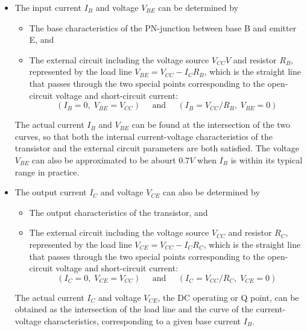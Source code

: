 \begin{itemize}
\item The input current $I_B$ and voltage $V_{BE}$ can be determined by 
  \begin{itemize}
    \item The base characteristics of the PN-junction between base B and 
      emitter E, and
    \item The external circuit including the voltage source $V_{CC}V$ and 
      resistor $R_B$, represented by the load line $V_{BE}=V_{CC}-I_C R_B$,
      which is the straight line that passes through the two special points 
      corresponding to the open-circuit voltage and short-circuit current: 
      \[
      (I_B=0,\;V_{BE}=V_{CC})\;\;\;\;\;\mbox{and}\;\;\;\;\;(I_B=V_{CC}/R_B,\;V_{BE}=0) 
      \]
  \end{itemize}
  The actual current $I_B$ and $V_{BE}$ can be found at the intersection of 
  the two curves, so that both the internal current-voltage characteristics 
  of the transistor and the external circuit parameters are both satisfied. 
  The voltage $V_{BE}$ can also be approximated to be abourt $0.7V$ when 
  $I_B$ is within its typical range in practice.


\item The output current $I_C$ and voltage $V_{CE}$ can also be determined by 
  \begin{itemize}
    \item The output characteristics of the transistor, and
    \item The external circuit including the voltage source $V_{CC}$ and 
      resistor $R_C$, represented by the load line $V_{CE}=V_{CC}-I_C R_C$, 
      which is the straight line that passes through the two special points
      corresponding to the open-circuit voltage and short-circuit current: 
      \[
      (I_C=0,\;V_{CE}=V_{CC})\;\;\;\;\;\mbox{and}\;\;\;\;\;(I_C=V_{CC}/R_C,\;V_{CE}=0) 
      \]
  \end{itemize}
  The actual current $I_C$ and voltage $V_{CE}$, the DC operating or Q point,
  can be obtained as the intersection of the load line and the curve of the 
  current-voltage characteristics, corresponding to a given base current $I_B$.

\end{itemize}

